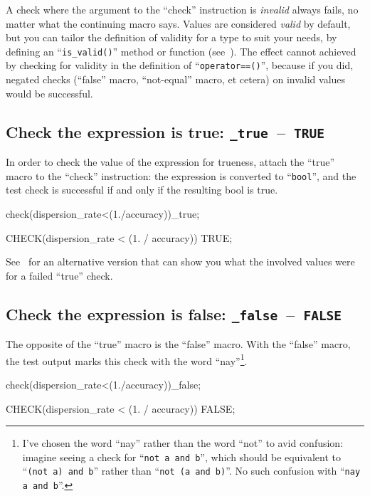 \documentclass[twoside, a4paper, article]{memoir}
\newcommand*\testudocolor{\color{red!80!blue}}
\newcommand*\testudo[1]{\texttt{\testudocolor{}#1}}
\newcommand*\testudopair[2]{\testudo{#1}~--~\testudo{#2}}
\newcommand\subsectiontestudopair[3]{%
  \subsection[#1]{#1: \testudopair{#2}{#3}}}
\begin{document}
A check where the argument to the ``check'' instruction is \emph{invalid}
always fails, no matter what the continuing macro says.  Values are considered
\emph{valid} by default, but you can tailor the definition of validity for a
type to suit your needs, by defining an ``\texttt{is\_valid()}'' method or
function (see~).  The effect cannot achieved by checking for
validity in the definition of ``\texttt{operator==()}'', because if you did,
negated checks (``false'' macro, ``not-equal'' macro, et cetera) on invalid
values would be successful.

\subsectiontestudopair{Check the expression is true}{\_true}{TRUE}
\label{sec:check-expression-true}

In order to check the value of the expression for trueness, attach the ``true''
macro to the ``check'' instruction: the expression is converted to
``\texttt{bool}'', and the test check is successful if and only if the
resulting bool is true.

\begin{cpplisting}
check(dispersion_rate<(1./accuracy))_true;
\end{cpplisting}

\begin{cpplisting}
CHECK(dispersion_rate < (1. / accuracy)) TRUE;
\end{cpplisting}

See~ for an alternative version that can
show you what the involved values were for a failed ``true'' check.

\subsectiontestudopair{Check the expression is false}{\_false}{FALSE}
\label{sec:check-expression-true}

The opposite of the ``true'' macro is the ``false'' macro.  With the ``false''
macro, the test output marks this check with the word ``nay''\footnote{I've
  chosen the word ``nay'' rather than the word ``not'' to avid confusion:
  imagine seeing a check for ``\texttt{not a and b}'', which should be
  equivalent to ``\texttt{(not a) and b}'' rather than ``\texttt{not (a and
    b)}''.  No such confusion with ``\texttt{nay a and b}''.}.

\begin{cpplisting}
check(dispersion_rate<(1./accuracy))_false;
\end{cpplisting}

\begin{cpplisting}
CHECK(dispersion_rate < (1. / accuracy)) FALSE;
\end{cpplisting}
\end{document}
